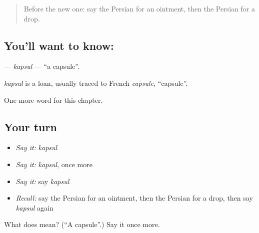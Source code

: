 \begin{quote}
Before the new one: say the Persian for an ointment, then the Persian for a drop.
\end{quote}

\subsection*{You'll want to know: }
\textbf{} — \emph{kapsul} — \textquotedblleft{}a capsule\textquotedblright{}.

\begin{cousinweb}
\emph{kapsul} is a loan, usually traced to French \emph{capsule}, \textquotedblleft{}capsule\textquotedblright{}.
\end{cousinweb}

\begin{grammarlens}[title={What you've built}]
One more word for this chapter.
\end{grammarlens}

\subsection*{Your turn}
\begin{itemize}
\raggedright
  \item \emph{Say it:} \emph{kapsul}
  \item \emph{Say it:} \emph{kapsul}, once more
  \item \emph{Say it:} say \emph{kapsul}
  \item \emph{Recall:} say the Persian for an ointment, then the Persian for a drop, then say \emph{kapsul} again
\end{itemize}

\begin{tcolorbox}[breakable,colback=teal!4,colframe=teal!35!black,title={Before you move on}]
What does  mean? (\textquotedblleft{}A capsule\textquotedblright{}.) Say it once more.
\end{tcolorbox}
